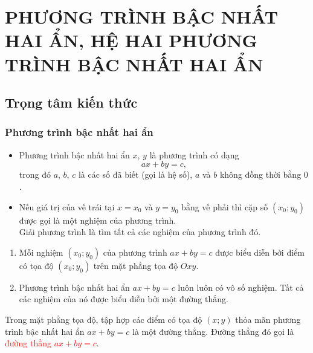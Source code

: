\setcounter{section}{1}
\section{PHƯƠNG TRÌNH BẬC NHẤT HAI ẨN, HỆ HAI PHƯƠNG TRÌNH BẬC NHẤT HAI ẨN}
\subsection{Trọng tâm kiến thức}
\begin{tomtat}
\subsubsection{Phương trình bậc nhất hai ẩn}
\begin{boxdn}
	\begin{itemize}
	\item Phương trình bậc nhất hai ẩn $x$, $y$ là phương trình có dạng
	\[ax+by=c,\]
	trong đó $a$, $b$, $c$ là các số đã biết (gọi là hệ số), $a$ và $b$ không đồng thời bằng $0$.
	\item Nếu giá trị của vế trái tại $x=x_0$ và $y=y_0$ bằng vế phải thì cặp số $\left(x_0;y_0\right)$ được gọi là một nghiệm của phương trình.
	\\ Giải phương trình là tìm tất cả các nghiệm của phương trình đó.
	\end{itemize}
\end{boxdn}
\begin{note}
	\begin{enumerate}[\bf --]
	\item Mỗi nghiệm $\left(x_0;y_0\right)$ của phương trình $ax+by=c$ được biểu diễn bởi điểm có tọa độ $\left(x_0;y_0\right)$ trên mặt phẳng tọa độ $Oxy$.
	\item Phương trình bậc nhất hai ẩn $ax+by=c$ luôn luôn có vô số nghiệm. Tất cả các nghiệm của nó được biểu diễn bởi một đường thẳng.
	\end{enumerate}
\end{note}
\begin{nx}
	Trong mặt phẳng tọa độ, tập hợp các điểm có tọa độ $(x;y)$ thỏa mãn phương trình bậc nhất hai ẩn $ax+by=c$ là một đường thẳng. Đường thẳng đó gọi là \textcolor{red}{đường thẳng $ax+by=c$}.
\end{nx}

\end{tomtat}
